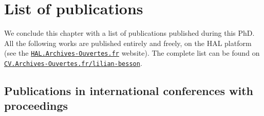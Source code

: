 \newpage


\section{List of publications}
\label{sec:1:listPublications}

We conclude this chapter with a list of publications published during this PhD.
All the following works are published entirely and freely, on the HAL platform (see the \href{https://hal.archives-ouvertes.fr/}{\texttt{HAL.Archives-Ouvertes.fr}} website).
The complete list can be found on
\href{https://cv.archives-ouvertes.fr/lilian-besson/}{\texttt{CV.Archives-Ouvertes.fr/lilian-besson}}.


\subsection*{Publications in international conferences with proceedings}

